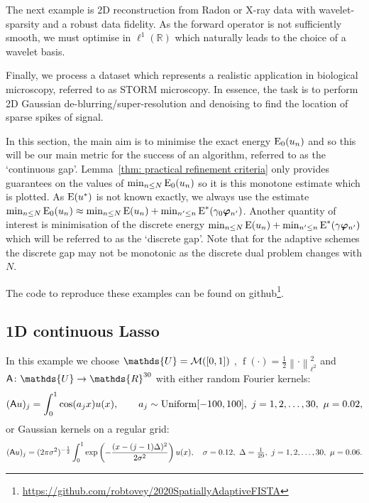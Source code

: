 \documentclass[smallextended]{svjour3}
\let\F\mathds\let\C\mathcal\newcommand{\R}{\F{R}}\newcommand{\A}{\tens{A}}
\newcommand{\norm}[1]{{\left\lVert #1 \right\rVert}}
\newcommand{\op}[1]{\operatorname{#1}}
\newcommand{\1}{\F{1}}
\newcommand*{\varf}[1]{%
	\IfEqCase{#1}{%
		{0}{u}%
		{1}{v}%
		{2}{w}%
	}[u#1]%
}
\newcommand*{\spcf}[1]{%
	\IfEqCase{#1}{%
		{0}{\F{U}}%
		{1}{\F{V}}%
		{2}{\F{W}}%
	}[\F{U}#1]%
}
\newcommand*{\vard}[1]{%
	\IfEqCase{#1}{%
		{0}{\varphi}%
		{1}{\psi}%
	}[\varphi #1]%
}
\newcommand*{\varx}[1]{%
	\IfEqCase{#1}{%
		{0}{x}%
		{1}{y}%
		{2}{z}%
		{3}{r}%
	}[x#1]%
}
\newcommand*{\vars}[1]{%
	\IfEqCase{#1}{%
		{0}{\alpha}%
		{1}{\beta}%
		{2}{\gamma}%
		{3}{a}%
		{4}{b}%
		{5}{c}%
	}[k#1]%
}
\newcommand*{\vvard}[1]{\vec{\vard{#1}}}
\newcommand{\edit}[2]{{\ifmmode\text{\color{red}\sout{\ensuremath{#1}}}\else {\color{red} \sout{#1}}\fi} {\color{darkgreen} #2}}
\begin{document}
	The next example is 2D reconstruction from Radon or X-ray data with wavelet-sparsity\edit{}{ and a robust data fidelity}. As the forward operator is not sufficiently smooth, we must optimise in $\ell^1(\R)$ which naturally leads to the choice of a wavelet basis. 
	
	Finally, we process a dataset which represents a realistic application in biological microscopy, referred to as STORM microscopy. In essence, the task is to perform 2D Gaussian de-blurring/super-resolution and denoising to find the location of sparse spikes of signal.
	
	In this section, the main aim is to minimise the exact \edit{Lasso }{}energy $\op{E}_0(\varf0_n)$ and so this will be our main metric for the success of an algorithm, referred to as the `continuous gap'. Lemma~\ref{thm: practical refinement criteria} only provides guarantees on the values of $\min_{n\leq N}\op{E}_0(\varf0_n)$ so it is this monotone estimate which is plotted. As $\op{E}(\varf0^*)$ is not known exactly, we always use the estimate $\min_{n\leq N}\op{E}_0(\varf0_n) \approx \min_{n\leq N}\op{E}(\varf0_n) + \min_{n'\leq n}\op{E}^*(\vars2_0\vvard0_{n'})$. Another quantity of interest is minimisation of the discrete \edit{Lasso }{}energy $\min_{n\leq N}\op{E}(\varf0_n) + \min_{n'\leq n}\op{E}^*(\vars2\vvard0_{n'})$ which will be referred to as the `discrete gap'. Note that for the adaptive schemes the discrete gap may not be monotonic as the discrete dual problem changes with $N$.
	
	The code to reproduce these examples can be found on github\footnote{\href{https://github.com/robtovey/2020SpatiallyAdaptiveFISTA}{https://github.com/robtovey/2020SpatiallyAdaptiveFISTA}}.
	
	
	\subsection{1D continuous Lasso}\label{sec: 1D Lasso examples}
	In this example we choose $\spcf0=\C M([0,1])$\edit{}{, $\op{f}(\cdot)=\frac12\norm{\cdot}_{\ell^2}^2$} and $\A\colon \spcf0\to \R^{30}$ with either random Fourier kernels:
	\begin{equation}
		(\A\varf0)_j = \int_0^1\cos(\vars3_j\varx0)\varf0(\varx0), \qquad \vars3_j\sim \op{Uniform}[-100,100],\ j=1,2,\ldots,30,\ \mu =0.02, 
	\end{equation}
	or Gaussian kernels on a regular grid:
	\begin{equation}
		(\A\varf0)_j = (2\pi\sigma^2)^{-\frac12}\int_0^1\exp\left(-\frac{(\varx0-(j-1)\Delta)^2}{2\sigma^2}\right)\varf0(\varx0), \quad \sigma=0.12,\ \Delta = \tfrac1{29},\ j=1,2,\ldots,30,\ \mu=0.06.
	\end{equation}
	
\end{document}
